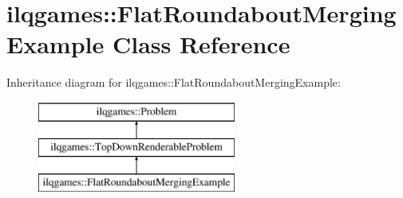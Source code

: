 \hypertarget{classilqgames_1_1_flat_roundabout_merging_example}{}\section{ilqgames\+:\+:Flat\+Roundabout\+Merging\+Example Class Reference}
\label{classilqgames_1_1_flat_roundabout_merging_example}
Inheritance diagram for ilqgames\+:\+:Flat\+Roundabout\+Merging\+Example\+:\begin{figure}[H]
\begin{center}
\leavevmode
\includegraphics[height=3.000000cm]{classilqgames_1_1_flat_roundabout_merging_example}
\end{center}
\end{figure}
